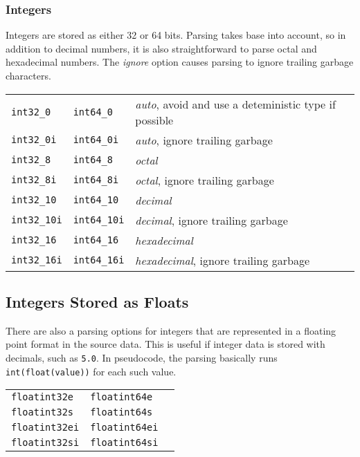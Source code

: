 \subsubsection{Integers}
Integers are stored as either 32 or 64 bits.  Parsing takes base into
account, so in addition to decimal numbers, it is also straightforward
to parse octal and hexadecimal numbers.  The \emph{ignore} option
causes parsing to ignore trailing garbage characters.\\

\begin{tabular}{lll}
  \texttt{int32\_0}   & \texttt{int64\_0}   & \emph{auto}, avoid and use a deteministic type if possible \\
  \texttt{int32\_0i}  & \texttt{int64\_0i}  & \emph{auto}, ignore trailing garbage \\
  \texttt{int32\_8}   & \texttt{int64\_8}   & \emph{octal} \\
  \texttt{int32\_8i}  & \texttt{int64\_8i}  & \emph{octal}, ignore trailing garbage \\
  \texttt{int32\_10}  & \texttt{int64\_10}  & \emph{decimal} \\
  \texttt{int32\_10i} & \texttt{int64\_10i} & \emph{decimal}, ignore trailing garbage \\
  \texttt{int32\_16}  & \texttt{int64\_16}  & \emph{hexadecimal} \\
  \texttt{int32\_16i} & \texttt{int64\_16i} & \emph{hexadecimal}, ignore trailing garbage \\
\end{tabular}



\subsection{Integers Stored as Floats}

There are also a parsing options for integers that are represented in
a floating point format in the source data.  This is useful if integer
data is stored with decimals, such as \texttt{5.0}.  In pseudocode,
the parsing basically runs \texttt{int(float(value))} for each such
value.\\

\begin{tabular}{lll}
  \texttt{floatint32e} & \texttt{floatint64e}  & \\
  \texttt{floatint32s} & \texttt{floatint64s}  & \\
  \texttt{floatint32ei}& \texttt{floatint64ei} & \\
  \texttt{floatint32si}& \texttt{floatint64si} & \\
\end{tabular}


